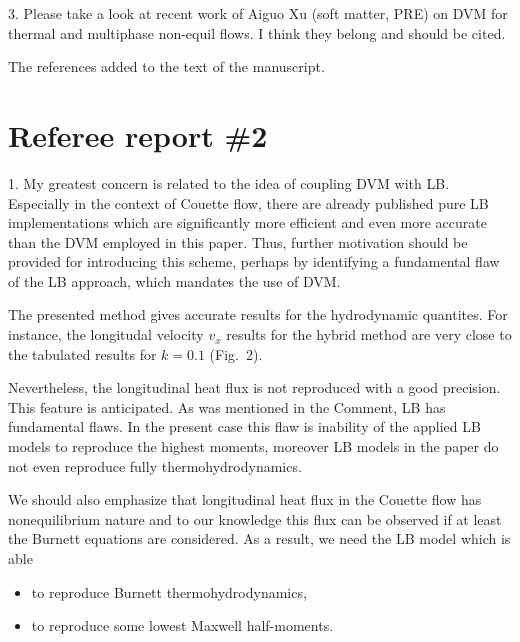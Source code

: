 \documentclass{article}
\begin{document}
\begin{leftbar}
\end{leftbar}

\begin{quoting}
    3. Please take a look at recent work of Aiguo Xu (soft matter, PRE) on DVM for
    thermal and multiphase non-equil flows. I think they belong and should be cited.
\end{quoting}

The references added to the text of the manuscript.

\begin{leftbar}
\end{leftbar}

\section*{Referee report \#2}

\begin{quoting}
    1. My greatest concern is related to the idea of coupling
    DVM with LB. Especially in the context of Couette flow,
    there are already published pure LB implementations which
    are significantly more efficient and even more accurate
    than the DVM employed in this paper. Thus, further
    motivation should be provided for introducing this scheme,
    perhaps by identifying a fundamental flaw of the LB approach,
    which mandates the use of DVM.
\end{quoting}

The presented method gives accurate results for the hydrodynamic quantites.
For instance, the longitudal velocity $v_x$ results for the hybrid method
are very close to the tabulated results for $k=0.1$ (Fig.~2).

Nevertheless, the longitudinal heat flux is not reproduced with a good precision.
This feature is anticipated. As was mentioned in the Comment, LB has fundamental flaws.
In the present case this flaw is inability of the applied LB models to reproduce the highest moments,
moreover LB models in the paper do not even reproduce fully thermohydrodynamics.

We should also emphasize that longitudinal heat flux in the Couette flow has nonequilibrium nature
and to our knowledge this flux can be observed if at least the Burnett equations are considered.
As a result, we need the LB model which is able
\begin{itemize}
    \item to reproduce Burnett thermohydrodynamics,
    \item to reproduce some lowest Maxwell half-moments.
\end{itemize}
\end{document}
